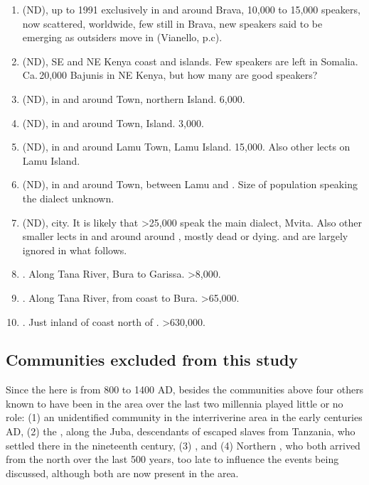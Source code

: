 \documentclass[output=paper,newtxmath,modfonts,nonflat,hidelinks]{langsci/langscibook}
\begin{document}
\begin{enumerate}

\item {} (ND), up to 1991 exclusively in and around Brava, 10,000 to 15,000 speakers, now scattered, worldwide, few still in Brava, new speakers said to be emerging as outsiders move in (Vianello, p.c).

\item {} (ND), SE  and NE Kenya coast and islands. Few speakers are left in Somalia. Ca.\,20,000 Bajunis in NE Kenya, but how many are good speakers? 

\item {} (ND), in and around  Town, northern  Island. 6,000.

\item {} (ND), in and around  Town,  Island. 3,000.

\item {} (ND), in and around Lamu Town, Lamu Island. 15,000. Also other lects on Lamu Island.

\item {} (ND), in and around  Town, between Lamu and . Size of population  speaking the dialect unknown.

\item {} (ND),  city. It is likely that >25,000 speak the main dialect, Mvita. Also other smaller lects in and around around , mostly dead or dying.   and  are largely ignored in what follows.

\item {}. Along Tana River, Bura to Garissa. >8,000.

\item {}. Along Tana River, from coast to Bura. >65,000.

\item {}. Just inland of coast north of . >630,000.

\end{enumerate}

\subsection{Communities excluded from this study}\label{sec:nurse:2.4} 

Since the  here is from 800 to 1400 AD, besides the communities above four others known to have been in the area over the last two millennia played little or no role: (1) an unidentified  community in the interriverine area in the early centuries AD, (2) the , along the Juba, descendants of escaped slaves from Tanzania, who settled there in the nineteenth century, (3) , and (4) Northern , who both arrived from the north over the last 500 years, too late to influence the events being discussed, although both are now present in the area. 
\end{document}
